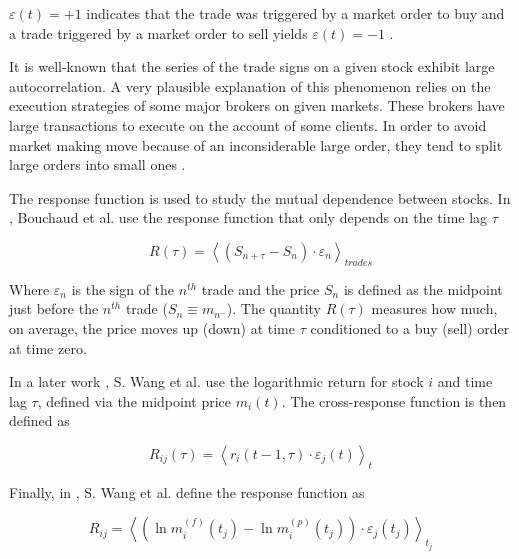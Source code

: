 $\varepsilon(t) = +1$ indicates that the trade was triggered by a market order
to buy and a trade triggered by a market order to sell yields
$\varepsilon(t) = -1$
\cite{subtle_nature,Bouchaud_2004,spread_changes_affect,quant_stock_price_response,order_flow_persistent}.

It is well-known that the series of the trade signs on a given stock exhibit
large autocorrelation. A very plausible explanation of this phenomenon relies
on the execution strategies of some major brokers on given markets. These
brokers have large transactions to execute on the account of some clients. In
order to avoid market making move because of an inconsiderable large order,
they tend to split large orders into small ones \cite{empirical_facts}.

The response function is used to study the mutual dependence between stocks. In
\cite{r_walks_liquidity,Bouchaud_2004}, Bouchaud et al. use the response
function that only depends on the time lag $\tau$

\begin{equation}\label{eq:Bouchaud_2004}
    R\left(\tau\right)=\left\langle \left(S_{n+\tau}-S_{n}\right) \cdot
    \varepsilon_{n}\right\rangle_{trades}
\end{equation}

Where $\varepsilon_{n}$ is the sign of the $n^{th}$ trade and the price $S_n$
is defined as the midpoint just before the $n^{th}$ trade
($S_{n} \equiv m_{n^{-}}$).
The quantity $R\left(\tau\right)$ measures how much, on average, the price
moves up (down) at time $\tau$ conditioned to a buy (sell) order at time zero.

In a later work \cite{Wang_2016_cross}, S. Wang et al. use the logarithmic
return for stock $i$ and time lag $\tau$, defined via the midpoint price
$m_{i} \left( t \right)$. The cross-response function is then defined as

\begin{equation}\label{eq:Wang_2016}
    R_{ij}\left(\tau\right)=\left\langle r_{i}\left(t-1,\tau\right)\cdot
    \varepsilon_{j} \left(t\right) \right\rangle _{t}
\end{equation}

Finally, in \cite{Wang_2018_b}, S. Wang et al. define the response function as

\begin{equation}\label{eq:Wang_2018_b}
    R_{ij} = \left\langle \left(\ln m_{i}^{\left(f\right)}\left(t_{j}\right)-
    \ln m_{i}^{\left(p\right)} \left(t_{j}\right) \right)\cdot\varepsilon_{j}
    \left(t_{j}\right)\right\rangle _{t_{j}}
\end{equation}

